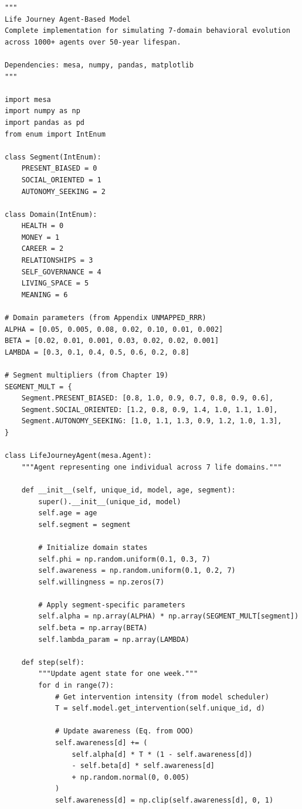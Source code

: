 \begin{verbatim}
"""
Life Journey Agent-Based Model
Complete implementation for simulating 7-domain behavioral evolution
across 1000+ agents over 50-year lifespan.

Dependencies: mesa, numpy, pandas, matplotlib
"""

import mesa
import numpy as np
import pandas as pd
from enum import IntEnum

class Segment(IntEnum):
    PRESENT_BIASED = 0
    SOCIAL_ORIENTED = 1
    AUTONOMY_SEEKING = 2

class Domain(IntEnum):
    HEALTH = 0
    MONEY = 1
    CAREER = 2
    RELATIONSHIPS = 3
    SELF_GOVERNANCE = 4
    LIVING_SPACE = 5
    MEANING = 6

# Domain parameters (from Appendix UNMAPPED_RRR)
ALPHA = [0.05, 0.005, 0.08, 0.02, 0.10, 0.01, 0.002]
BETA = [0.02, 0.01, 0.001, 0.03, 0.02, 0.02, 0.001]
LAMBDA = [0.3, 0.1, 0.4, 0.5, 0.6, 0.2, 0.8]

# Segment multipliers (from Chapter 19)
SEGMENT_MULT = {
    Segment.PRESENT_BIASED: [0.8, 1.0, 0.9, 0.7, 0.8, 0.9, 0.6],
    Segment.SOCIAL_ORIENTED: [1.2, 0.8, 0.9, 1.4, 1.0, 1.1, 1.0],
    Segment.AUTONOMY_SEEKING: [1.0, 1.1, 1.3, 0.9, 1.2, 1.0, 1.3],
}

class LifeJourneyAgent(mesa.Agent):
    """Agent representing one individual across 7 life domains."""

    def __init__(self, unique_id, model, age, segment):
        super().__init__(unique_id, model)
        self.age = age
        self.segment = segment

        # Initialize domain states
        self.phi = np.random.uniform(0.1, 0.3, 7)
        self.awareness = np.random.uniform(0.1, 0.2, 7)
        self.willingness = np.zeros(7)

        # Apply segment-specific parameters
        self.alpha = np.array(ALPHA) * np.array(SEGMENT_MULT[segment])
        self.beta = np.array(BETA)
        self.lambda_param = np.array(LAMBDA)

    def step(self):
        """Update agent state for one week."""
        for d in range(7):
            # Get intervention intensity (from model scheduler)
            T = self.model.get_intervention(self.unique_id, d)

            # Update awareness (Eq. from OOO)
            self.awareness[d] += (
                self.alpha[d] * T * (1 - self.awareness[d])
                - self.beta[d] * self.awareness[d]
                + np.random.normal(0, 0.005)
            )
            self.awareness[d] = np.clip(self.awareness[d], 0, 1)


\end{verbatim}
